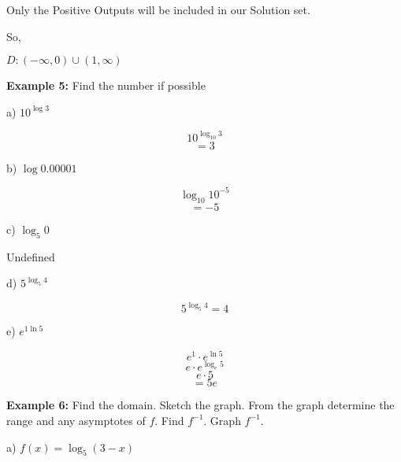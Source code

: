 \documentclass{report}
\begin{document}
\noindent Only the Positive Outputs will be included in our Solution set.
\vspace{3mm}

\noindent So,
\vspace{3mm}

$D:(-\infty, 0)\cup(1,\infty)$

\pagebreak
{}

\bigbreak \noindent \bigbreak \noindent
 \begin{large}
	 \textbf{Example 5:} 
	 Find the number if possible
 \end{large} 
\bigbreak \noindent
\begin{large}
  a) $10^{\log 3}$
\end{large}


$$10^{\log_{10}3}$$
$$ = 3 $$
\bigbreak \noindent \bigbreak \noindent
\begin{large}
  b) $\log 0.00001$
\end{large}


$$\log_{10}10^{-5}$$
$$=-5$$
\bigbreak \noindent \bigbreak \noindent
\begin{large}
  c) $\log _5 0$
\end{large}


\begin{center}
	Undefined
\end{center}
\bigbreak \noindent \bigbreak \noindent
\begin{large}
  d) $5^{\log _5 4}$
\end{large}


  $$5^{\log _5 4} = 4$$
\bigbreak \noindent \bigbreak \noindent
\begin{large}
  e) $e^{1\ln 5}$
\end{large}


$$ e^1 \cdot e^{\ln5}$$
$$e \cdot e^{\log_{e}5}$$
$$e \cdot 5$$
$$=5e$$

\pagebreak \noindent

\begin{large}
	\noindent \textbf{Example 6:} 
	Find the domain. Sketch the graph. From the graph determine the range and any asymptotes of $f$. Find $f^{-1}$. Graph $f^{-1}$.
\end{large}
\bigbreak \noindent \bigbreak \noindent
\begin{large}
 a) $f(x)=\log _5(3-x)$ 
\end{large}

\end{document}
